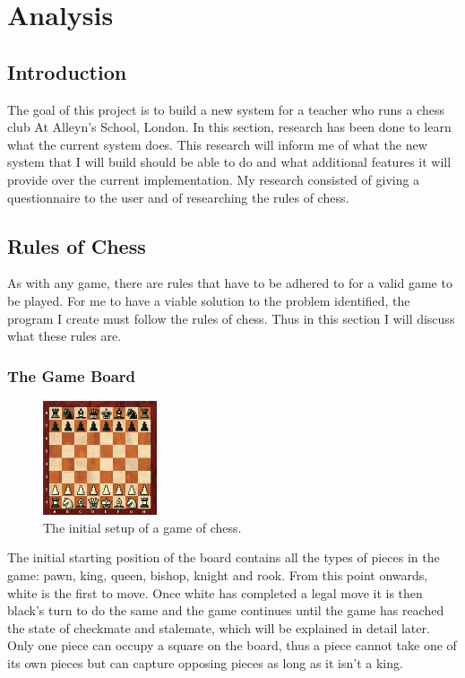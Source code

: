 \chapter{Analysis}
\section{Introduction} \label{introduction}
The goal of this project is to build a new system for a teacher who runs a chess club At Alleyn's School, London. In this section, research has been done to learn what the current system does. This research will inform me of what the new system that I will build should be able to do and what additional features it will provide over the current implementation. My research consisted of giving a questionnaire to the user and of researching the rules of chess.
\section{Rules of Chess}
As with any game, there are rules that have to be adhered to for a valid game to be played. For me to have a viable solution to the problem identified, the program I create must follow the rules of chess. Thus in this section I will discuss what these rules are.
\subsection{The Game Board}
\begin{figure}[H]
\centering
	\includegraphics[width=0.3\textwidth]{images/boards/initial_board}
	\caption{The initial setup of a game of chess.}
	\label{initial-board}
\end{figure}
The initial starting position of the board contains all the types of pieces in the game: pawn, king, queen, bishop, knight and rook. From this point onwards, white is the first to move. Once white has completed a legal move it is then black's turn to do the same and the game continues until the game has reached the state of checkmate and stalemate, which will be explained in detail later. Only one piece can occupy a square on the board, thus a piece cannot take one of its own pieces but can capture opposing pieces as long as it isn't a king.

